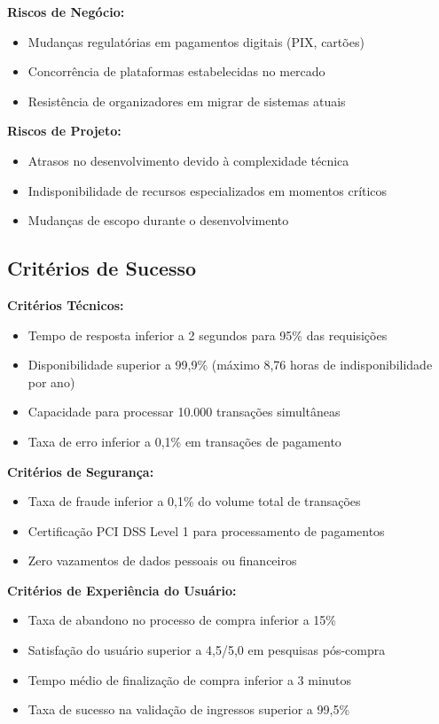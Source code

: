 \textbf{Riscos de Negócio:}
\begin{itemize}
    \item Mudanças regulatórias em pagamentos digitais (PIX, cartões)
    \item Concorrência de plataformas estabelecidas no mercado
    \item Resistência de organizadores em migrar de sistemas atuais
\end{itemize}

\textbf{Riscos de Projeto:}
\begin{itemize}
    \item Atrasos no desenvolvimento devido à complexidade técnica
    \item Indisponibilidade de recursos especializados em momentos críticos
    \item Mudanças de escopo durante o desenvolvimento
\end{itemize}

\subsection{Critérios de Sucesso}

\textbf{Critérios Técnicos:}
\begin{itemize}
    \item Tempo de resposta inferior a 2 segundos para 95\% das requisições
    \item Disponibilidade superior a 99,9\% (máximo 8,76 horas de indisponibilidade por ano)
    \item Capacidade para processar 10.000 transações simultâneas
    \item Taxa de erro inferior a 0,1\% em transações de pagamento
\end{itemize}

\textbf{Critérios de Segurança:}
\begin{itemize}
    \item Taxa de fraude inferior a 0,1\% do volume total de transações
    \item Certificação PCI DSS Level 1 para processamento de pagamentos
    \item Zero vazamentos de dados pessoais ou financeiros
\end{itemize}

\textbf{Critérios de Experiência do Usuário:}
\begin{itemize}
    \item Taxa de abandono no processo de compra inferior a 15\%
    \item Satisfação do usuário superior a 4,5/5,0 em pesquisas pós-compra
    \item Tempo médio de finalização de compra inferior a 3 minutos
    \item Taxa de sucesso na validação de ingressos superior a 99,5\%
\end{itemize}

